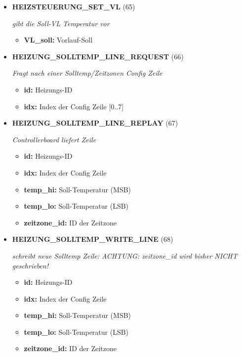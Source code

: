 \begin{itemize}
\item \textbf{HEIZSTEUERUNG\_SET\_VL} (65)

\textit{gibt die Soll-VL Temperatur vor}

\small
\begin{itemize}
		
\item \textbf{VL\_soll:} Vorlauf-Soll
\end{itemize}
\normalsize
	
\item \textbf{HEIZUNG\_SOLLTEMP\_LINE\_REQUEST} (66)

\textit{Fragt nach einer Solltemp/Zeitzonen Config Zeile}

\small
\begin{itemize}
		
\item \textbf{id:} Heizungs-ID
\item \textbf{idx:} Index der Config Zeile [0..7]
\end{itemize}
\normalsize
	
\item \textbf{HEIZUNG\_SOLLTEMP\_LINE\_REPLAY} (67)

\textit{Controllerboard liefert Zeile}

\small
\begin{itemize}
		
\item \textbf{id:} Heizungs-ID
\item \textbf{idx:} Index der Config Zeile
\item \textbf{temp\_hi:} Soll-Temperatur (MSB)
\item \textbf{temp\_lo:} Soll-Temperatur (LSB)
\item \textbf{zeitzone\_id:} ID der Zeitzone
\end{itemize}
\normalsize
	
\item \textbf{HEIZUNG\_SOLLTEMP\_WRITE\_LINE} (68)

\textit{schreibt neue Solltemp Zeile: ACHTUNG: zeitzone\_id wird bisher NICHT geschrieben!}

\small
\begin{itemize}
		
\item \textbf{id:} Heizungs-ID
\item \textbf{idx:} Index der Config Zeile
\item \textbf{temp\_hi:} Soll-Temperatur (MSB)
\item \textbf{temp\_lo:} Soll-Temperatur (LSB)
\item \textbf{zeitzone\_id:} ID der Zeitzone
\end{itemize}
\normalsize
	

\end{itemize}
